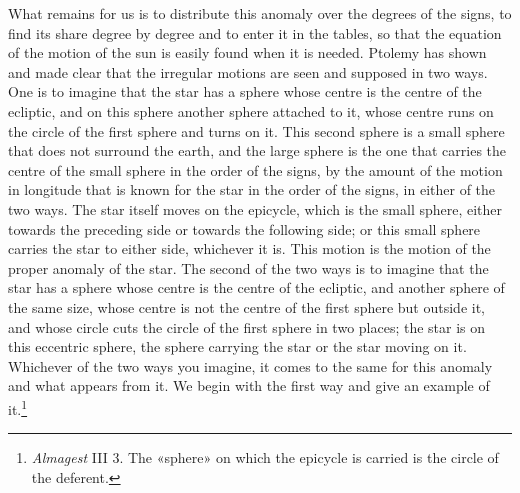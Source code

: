 \documentclass[11pt]{article}
\newcommand{\ArPage}[1]{\marginpar{\footnotesize\color{gray}Ar.\,p.\,#1}}
\begin{document}
\par \ArPage{68}What remains for us is to distribute this anomaly over the degrees of the signs, to find its share degree by degree and to enter it in the tables, so that the equation of the motion of the sun is easily found when it is needed. Ptolemy has shown and made clear that the irregular motions are seen and supposed in two ways. One is to imagine that the star has a sphere whose centre is the centre of the ecliptic, and on this sphere another sphere attached to it, whose centre runs on the circle of the first sphere and turns on it. This second sphere is a small sphere that does not surround the earth, and the large sphere is the one that carries the centre of the small sphere in the order of the signs, by the amount of the motion in longitude that is known for the star in the order of the signs, in either of the two ways. The star itself moves on the epicycle, which is the small sphere, either towards the preceding side or towards the following side; or this small sphere carries the star to either side, whichever it is. This motion is the motion of the proper anomaly of the star. The second of the two ways is to imagine that the star has a sphere whose centre is the centre of the ecliptic, and another sphere of the same size, whose centre is not the centre of the first sphere but outside it, and whose circle cuts the circle of the first sphere in two places; the star is on this eccentric sphere, the sphere carrying the star or the star moving on it. Whichever of the two ways you imagine, it comes to the same for this anomaly and what appears from it. We begin with the first way and give an example of it.\footnote{\emph{Almagest} III 3. The «sphere» on which the epicycle is carried is the circle of the deferent.}\par
\end{document}
